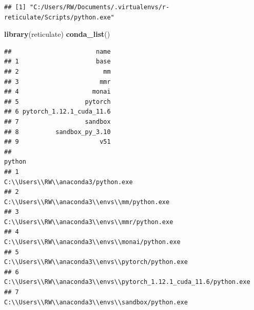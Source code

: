 \documentclass[
]{book}
\newenvironment{Shaded}{\begin{snugshade}}{\end{snugshade}}
\newcommand{\FunctionTok}[1]{\textcolor[rgb]{0.13,0.29,0.53}{\textbf{#1}}}
\newcommand{\NormalTok}[1]{#1}
\theoremstyle{definition}
\theoremstyle{definition}
\theoremstyle{definition}
\theoremstyle{definition}
\theoremstyle{remark}
\begin{document}
\begin{verbatim}
## [1] "C:/Users/RW/Documents/.virtualenvs/r-reticulate/Scripts/python.exe"
\end{verbatim}

\begin{Shaded}
\begin{Highlighting}[]
\FunctionTok{library}\NormalTok{(reticulate)}
\FunctionTok{conda\_list}\NormalTok{()}
\end{Highlighting}
\end{Shaded}

\begin{verbatim}
##                       name
## 1                     base
## 2                       mm
## 3                      mmr
## 4                    monai
## 5                  pytorch
## 6 pytorch_1.12.1_cuda_11.6
## 7                  sandbox
## 8          sandbox_py_3.10
## 9                      v51
##                                                                python
## 1                                 C:\\Users\\RW\\anaconda3/python.exe
## 2                       C:\\Users\\RW\\anaconda3\\envs\\mm/python.exe
## 3                      C:\\Users\\RW\\anaconda3\\envs\\mmr/python.exe
## 4                    C:\\Users\\RW\\anaconda3\\envs\\monai/python.exe
## 5                  C:\\Users\\RW\\anaconda3\\envs\\pytorch/python.exe
## 6 C:\\Users\\RW\\anaconda3\\envs\\pytorch_1.12.1_cuda_11.6/python.exe
## 7                  C:\\Users\\RW\\anaconda3\\envs\\sandbox/python.exe

\end{verbatim}
\end{document}
